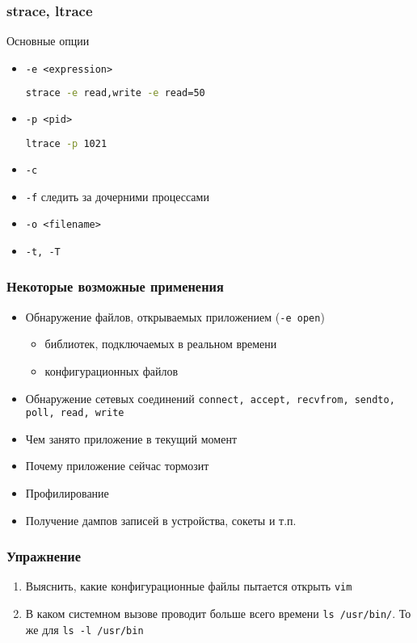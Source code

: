 \begin{frame}
  \frametitle{strace, ltrace}
  \begin{center}
   Основные опции 
  \end{center}
  \begin{itemize}
   \item \texttt{-e <expression>}
\begin{lstlisting}[language=sh]
  strace -e read,write -e read=50 
\end{lstlisting}
   \item \texttt{-p <pid>}
\begin{lstlisting}[language=sh]
  ltrace -p 1021
\end{lstlisting}
   \item \texttt{-c}
   \item \texttt{-f} следить за дочерними процессами
   \item \texttt{-o <filename>}
   \item \texttt{-t, -T}
  \end{itemize}
\end{frame}

\begin{frame}
 \frametitle{Некоторые возможные применения}
 \begin{itemize}
  \item Обнаружение файлов, открываемых приложением (\texttt{-e open})
    \begin{itemize}
      \item библиотек, подключаемых в реальном времени
      \item конфигурационных файлов
    \end{itemize}
   \item Обнаружение сетевых соединений \texttt{connect, accept, recvfrom, sendto, poll, read, write} 
   \item Чем занято приложение в текущий момент
   \item Почему приложение сейчас тормозит
   \item Профилирование
   \item Получение дампов записей в устройства, сокеты и т.п.
 \end{itemize}
\end{frame}

\begin{frame}
 \frametitle{Упражнение}
 \begin{enumerate}
   \item Выяснить, какие конфигурационные файлы пытается открыть \texttt{vim}
   \item В каком системном вызове проводит больше всего времени \texttt{ls /usr/bin/}. То же для \texttt{ls -l /usr/bin}
 \end{enumerate}
\end{frame}
